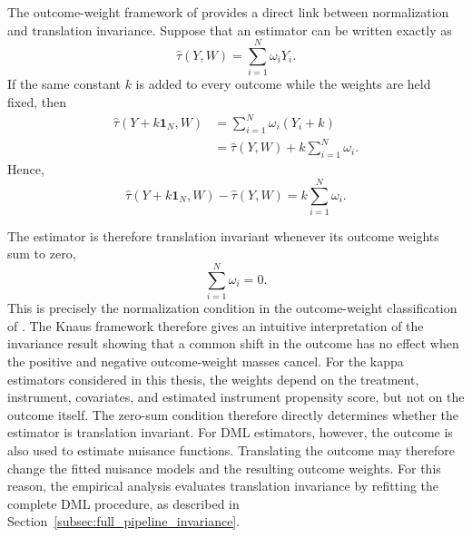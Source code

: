 \documentclass[12pt, a4paper, oneside]{article}
\theoremstyle{plain}
\theoremstyle{definition}
\begin{document}
The outcome-weight framework of \citet{knaus2024treatment} provides a direct link
between normalization and translation invariance. Suppose that an estimator can be
written exactly as
\begin{equation}
    \widehat{\tau}(Y,W)
    =
    \sum_{i=1}^{N}\omega_iY_i.
\end{equation}
If the same constant \(k\) is added to every outcome while the weights are held fixed,
then
\begin{align}
    \widehat{\tau}(Y+k\mathbf 1_N,W)
    &=
    \sum_{i=1}^{N}\omega_i(Y_i+k) \\
    &=
    \widehat{\tau}(Y,W)
    +
    k\sum_{i=1}^{N}\omega_i.
\end{align}
Hence,
\begin{equation}
    \widehat{\tau}(Y+k\mathbf 1_N,W)
    -
    \widehat{\tau}(Y,W)
    =
    k\sum_{i=1}^{N}\omega_i.
    \label{eq:translation_weight_identity}
\end{equation}

The estimator is therefore translation invariant whenever its outcome weights sum to
zero,
\begin{equation}
    \sum_{i=1}^{N}\omega_i=0.
    \label{eq:translation_zero_sum}
\end{equation}
This is precisely the normalization condition in the outcome-weight classification of
\citet{knaus2024treatment}. The Knaus framework therefore gives an intuitive
interpretation of the invariance result showing that a common shift in the outcome has no effect
when the positive and negative outcome-weight masses cancel.
For the kappa estimators considered in this thesis, the weights depend on the treatment,
instrument, covariates, and estimated instrument propensity score, but not on the
outcome itself. The zero-sum condition therefore directly determines whether the
estimator is translation invariant. For DML estimators, however, the outcome is also
used to estimate nuisance functions. Translating the outcome may therefore change the
fitted nuisance models and the resulting outcome weights. For this reason, the empirical
analysis evaluates translation invariance by refitting the complete DML procedure, as
described in Section~\ref{subsec:full_pipeline_invariance}.
\end{document}
